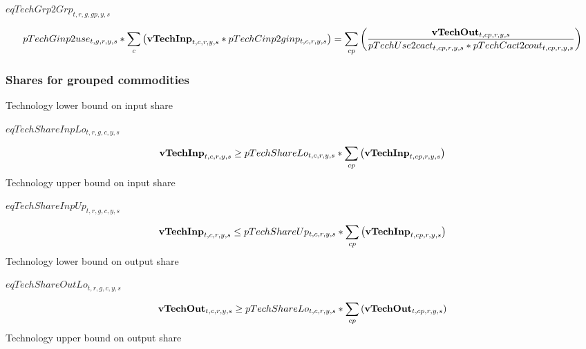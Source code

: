 \documentclass{article}
\begin{document}
$eqTechGrp2Grp_{t,r,g,gp,y,s}$





\begin{dmath} 
pTechGinp2use_{t,g,r,y,s}*\sum_{c}{\left({\bf vTechInp}_{t,c,r,y,s}*pTechCinp2ginp_{t,c,r,y,s}\right)}  =  \sum_{cp}{\left(\frac{{\bf vTechOut}_{t,cp,r,y,s}}{pTechUse2cact_{t,cp,r,y,s}*pTechCact2cout_{t,cp,r,y,s}}\right)}
\end{dmath} 
\subsubsection*{Shares for grouped commodities}
Technology lower bound on input share







$eqTechShareInpLo_{t,r,g,c,y,s}$





\begin{dmath} 
{\bf vTechInp}_{t,c,r,y,s}  \ge  pTechShareLo_{t,c,r,y,s}*\sum_{cp}{\left({\bf vTechInp}_{t,cp,r,y,s}\right)}
\end{dmath} 
Technology upper bound on input share







$eqTechShareInpUp_{t,r,g,c,y,s}$





\begin{dmath} 
{\bf vTechInp}_{t,c,r,y,s}  \le  pTechShareUp_{t,c,r,y,s}*\sum_{cp}{\left({\bf vTechInp}_{t,cp,r,y,s}\right)}
\end{dmath} 
Technology lower bound on output share







$eqTechShareOutLo_{t,r,g,c,y,s}$





\begin{dmath} 
{\bf vTechOut}_{t,c,r,y,s}  \ge  pTechShareLo_{t,c,r,y,s}*\sum_{cp}{\left({\bf vTechOut}_{t,cp,r,y,s}\right)}
\end{dmath} 
Technology upper bound on output share
\end{document}
